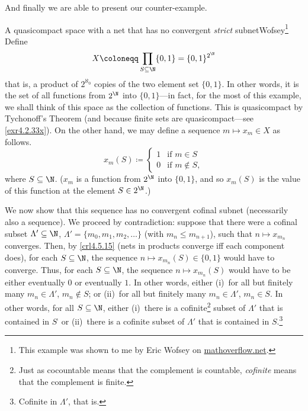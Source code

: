 And finally we are able to present our counter-example.
\begin{exm}{A quasicompact space with a net that has no convergent \emph{strict} subnet}{Wofsey}\footnote{This example was shown to me by Eric Wofsey on \href{http://mathoverflow.net/questions/210947/a-quasicompact-space-with-a-net-that-contains-no-convergent-strict-subnet}{mathoverflow.net}.}
Define
\begin{equation}
X\coloneqq \prod _{S\subseteq \N}\{ 0,1\} =\{ 0,1\} ^{2^{\N}}
\end{equation}
that is, a product of $2^{\aleph _0}$ copies of the two element set $\{ 0,1\}$.  In other words, it is the set of all functions from $2^{\N}$ into $\{ 0,1\}$---in fact, for the most of this example, we shall think of this space as the collection of functions.   This is quasicompact by Tychonoff's Theorem (and because finite sets are quasicompact---see \cref{exr4.2.33x}).  On the other hand, we may define a sequence $m\mapsto x_m\in X$ as follows.
\begin{equation}
x_m(S)\coloneqq \begin{cases}1 & \text{if }m\in S \\ 0 & \text{if }m\notin S,\end{cases}
\end{equation}
where $S\subseteq \N$.  ($x_m$ is a function from $2^{\N}$ into $\{ 0,1\}$, and so $x_m(S)$ is the value of this function at the element $S\in 2^{\N}$.)

We now show that this sequence has no convergent cofinal subnet (necessarily also a sequence).  We proceed by contradiction:  suppose that there were a cofinal subset $\Lambda '\subseteq \N$, $\Lambda '=\{ m_0,m_1,m_2,\ldots \}$ (with $m_n\leq m_{n+1}$), such that $n\mapsto x_{m_n}$ converges.  Then, by \cref{crl4.5.15} (nets in products converge iff each component does), for each $S\subseteq \N$, the sequence $n\mapsto x_{m_n}(S)\in \{ 0,1\}$ would have to converge.  Thus, for each $S\subseteq \N$, the sequence $n\mapsto x_{m_n}(S)$ would have to be either eventually $0$ or eventually $1$.  In other words, either (i)~for all but finitely many $m_n\in \Lambda '$, $m_n\notin S$;  or (ii)~for all but finitely many $m_n\in \Lambda '$, $m_n\in S$.  In other words, for all $S\subseteq \N$, either (i)~there is a cofinite\footnote{Just as cocountable means that the complement is countable, \emph{cofinite} means that the complement is finite.} subset of $\Lambda '$ that is contained in $S^{\comp}$ or (ii)~there is a cofinite subset of $\Lambda '$ that is contained in $S$.\footnote{Cofinite in $\Lambda '$, that is.}


\end{exm}
